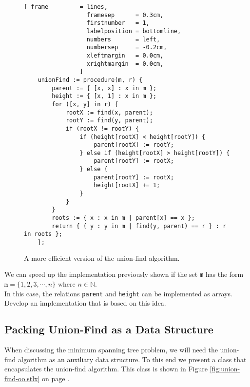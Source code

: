 \begin{figure}[!ht]
\centering
\begin{Verbatim}[ frame         = lines, 
                  framesep      = 0.3cm, 
                  firstnumber   = 1,
                  labelposition = bottomline,
                  numbers       = left,
                  numbersep     = -0.2cm,
                  xleftmargin   = 0.0cm,
                  xrightmargin  = 0.0cm,
                ]
    unionFind := procedure(m, r) {
        parent := { [x, x] : x in m };
        height := { [x, 1] : x in m };
        for ([x, y] in r) {
            rootX := find(x, parent);
            rootY := find(y, parent);
            if (rootX != rootY) {
                if (height[rootX] < height[rootY]) {
                    parent[rootX] := rootY;  
                } else if (height[rootX] > height[rootY]) {
                    parent[rootY] := rootX;  
                } else {
                    parent[rootY] := rootX;  
                    height[rootX] += 1;
                }
            }
        }
        roots := { x : x in m | parent[x] == x };
        return { { y : y in m | find(y, parent) == r } : r in roots };
    };
\end{Verbatim}
\vspace*{-0.3cm}
\caption{A more efficient version of the union-find algorithm.}
\label{fig:union-find.stlx}
\end{figure}

\exercise
We can speed up the implementation previously shown if the set \texttt{m} has the form
\\[0.2cm]
\hspace*{1.3cm}
$\mathtt{m} = \{ 1, 2, 3, \cdots, n \}$ \quad where $n \in \mathbb{N}$.
\\[0.2cm]
In this case, the relations \texttt{parent} and \texttt{height} can be implemented as arrays.
Develop an implementation that is based on this idea.
\eox

\subsection{Packing Union-Find as a Data Structure}
When discussing  the minimum spanning tree problem,  we will need the union-find algorithm as an
auxiliary data structure.  To this end we present a class that encapsulates the union-find
algorithm.  This class is shown in Figure \ref{fig:union-find-oo.stlx} on page
\pageref{fig:union-find-oo.stlx}.

